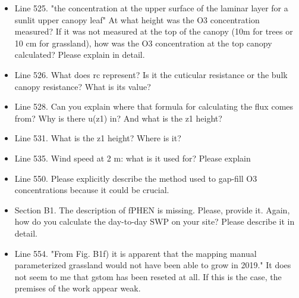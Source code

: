 \documentclass{scrartcl}
\begin{document}
\begin{itemize}
\item {\color{blue}Line 525.  "the concentration at the upper surface of the laminar layer for a sunlit upper canopy leaf" At what height was the O3 concentration measured? If it was not measured at the top of the canopy (10m for trees or 10 cm for grassland), how was the O3 concentration at the top canopy calculated?
Please explain in detail.}

\item {\color{blue}Line 526.  What does rc represent? Is it the cuticular resistance or the bulk canopy resistance? What is its value?}

\item {\color{blue}Line 528.  Can you explain where that formula for calculating the flux comes from? Why is there u(z1) in? And what is the z1 height?}

\item {\color{blue}Line 531. What is the z1 height? Where is it?}

\item {\color{blue}Line 535. Wind speed at 2 m: what is it used for? Please explain}

\item {\color{blue}Line 550. Please explicitly describe the method used to gap-fill O3 concentrations because it could be crucial.}

\item {\color{blue}Section B1. The description of fPHEN is missing. Please, provide it. Again, how do you calculate the day-to-day SWP on your site? Please describe it in detail.}

\item {\color{blue}Line 554. "From Fig. B1f) it is apparent that the mapping manual parameterized grassland would not have been able to grow in 2019." 
It does not seem to me that gstom has been reseted at all. If this is the case, the
premises of the work appear weak.}

\end{itemize}
\end{document}
